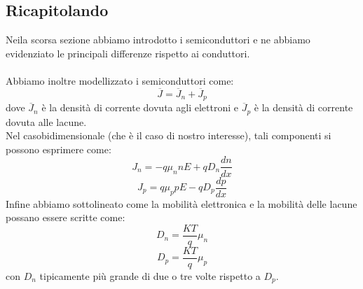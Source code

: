\documentclass[../main.tex]{subfiles}
\begin{document}
	\subsection{Ricapitolando}
	Neila scorsa sezione abbiamo introdotto i semiconduttori e ne abbiamo evidenziato le principali differenze rispetto ai conduttori.\\\\
	Abbiamo inoltre modellizzato i semiconduttori come:
	$$\overline{J} = \overline{J}_n + \overline{J}_p$$
	dove $\overline{J}_n$ è la densità di corrente dovuta agli elettroni e $\overline{J}_p$ è la densità di corrente dovuta alle lacune. \\
	Nel casobidimensionale (che è il caso di nostro interesse), tali componenti si possono esprimere come:
	$$J_n = -q\mu_n n E + q D_n \frac{dn}{dx}$$
	$$J_p = q\mu_p p E - q D_p \frac{dp}{dx}$$
	Infine abbiamo sottolineato come la mobilità elettronica e la mobilità delle lacune possano essere scritte come:
	$$D_n = \frac{KT}{q} \mu_n$$
	$$D_p = \frac{KT}{q} \mu_p$$
	con $D_n$ tipicamente più grande di due o tre volte rispetto a $D_p$.
\end{document}
